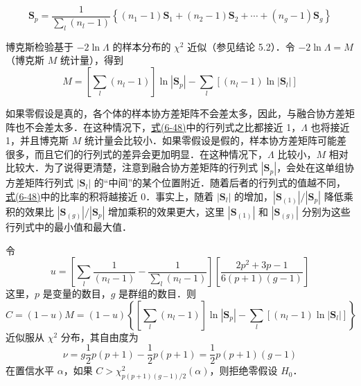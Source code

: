 
\label{eq:6-49}
\begin{equation}
\mathbf{S}_p=\frac{1}{\sum\limits_{l}(n_l-1)}\left\{(n_1-1)\mathbf{S}_1+(n_2-1)\mathbf{S}_2+\cdots+(n_g-1)\mathbf{S}_g\right\} \tag{6-49}
\end{equation}

博克斯检验基于 $-2\ln\Lambda$ 的样本分布的 $\chi^2$ 近似（参见结论 5.2）．令 $-2\ln\Lambda=M$（博克斯 $M$ 统计量），得到
\label{eq:6-50}
\begin{equation}
M=\left[\sum\limits_{l}(n_l-1)\right]\ln|\mathbf{S}_p|-\sum\limits_{l}\left[(n_l-1)\ln|\mathbf{S}_l|\right] \tag{6-50}
\end{equation}

如果零假设是真的，各个体的样本协方差矩阵不会差太多，因此，与融合协方差矩阵也不会差太多．在这种情况下，\hyperref[eq:6-48]{式(6-48)}中的行列式之比都接近 1，$\Lambda$ 也将接近 1，并且博克斯 $M$ 统计量会比较小．如果零假设是假的，样本协方差矩阵可能差很多，而且它们的行列式的差异会更加明显．在这种情况下，$\Lambda$ 比较小，$M$ 相对比较大．为了说得更清楚，注意到融合协方差矩阵的行列式 $|\mathbf{S}_p|$，会处在这单组协方差矩阵行列式 $|\mathbf{S}_l|$ 的“中间”的某个位置附近．随着后者的行列式的值越不同，\hyperref[eq:6-48]{式(6-48)}中的比率的积将越接近 0．事实上，随着 $|\mathbf{S}_l|$ 的增加，$|\mathbf{S}_{(1)}|/|\mathbf{S}_p|$ 降低乘积的效果比 $|\mathbf{S}_{(g)}|/|\mathbf{S}_p|$ 增加乘积的效果更大，这里 $|\mathbf{S}_{(1)}|$ 和 $|\mathbf{S}_{(g)}|$ 分别为这些行列式中的最小值和最大值．

\begin{mvframe}[协方差矩阵相等性的博克斯检验]
令
\label{eq:6-51}
\begin{equation}
u=\left[\sum\limits_{l}\frac{1}{(n_l-1)}-\frac{1}{\sum\limits_{l}(n_l-1)}\right]\left[\frac{2p^2+3p-1}{6(p+1)(g-1)}\right] \tag{6-51}
\end{equation}
这里，$p$ 是变量的数目，$g$ 是群组的数目．则
\label{eq:6-52}
\begin{equation}
C=(1-u)M=(1-u)\left\{\left[\sum\limits_{l}(n_l-1)\right]\ln|\mathbf{S}_p|-\sum\limits_{l}\left[(n_l-1)\ln|\mathbf{S}_l|\right]\right\} \tag{6-52}
\end{equation}
近似服从 $\chi^2$ 分布，其自由度为
\label{eq:6-53}
\begin{equation}
\nu=g\frac{1}{2}p(p+1)-\frac{1}{2}p(p+1)=\frac{1}{2}p(p+1)(g-1) \tag{6-53}
\end{equation}
在置信水平 $\alpha$，如果 $C>\chi_{p(p+1)(g-1)/2}^{2}(\alpha)$，则拒绝零假设 $H_0$．
\end{mvframe}

